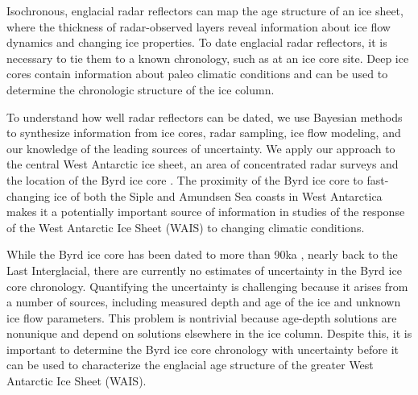 

Isochronous, englacial radar reflectors can map the age structure of an ice sheet, where the thickness of radar-observed layers reveal information about ice flow dynamics and changing ice properties. To date englacial radar reflectors, it is necessary to tie them to a known chronology, such as at an ice core site. Deep ice cores contain information about paleo climatic conditions and can be used to determine the chronologic structure of the ice column. 

To understand how well radar reflectors can be dated, we use Bayesian methods to synthesize information from ice cores, radar sampling, ice flow modeling, and our knowledge of the leading sources of uncertainty. We apply our approach to the central West Antarctic ice sheet, an area of concentrated radar surveys and the location of the Byrd ice core \cite[(80.0167$^\circ$S, 119.5167$^\circ$W),][]{gow1968}. The proximity of the Byrd ice core to fast-changing ice of both the Siple and Amundsen Sea coasts in West Antarctica makes it a potentially important source of information in studies of the response of the West Antarctic Ice Sheet (WAIS) to changing climatic conditions.



While the Byrd ice core has been dated to more than 90ka \citep{}, nearly back to the Last Interglacial, there are currently no estimates of uncertainty in the Byrd ice core chronology. Quantifying the uncertainty is challenging because it arises from a number of sources, including measured depth and age of the ice and unknown ice flow parameters. This problem is nontrivial because age-depth solutions are nonunique and depend on solutions elsewhere in the ice column. Despite this, it is important to determine the Byrd ice core chronology with uncertainty before it can be used to characterize the englacial age structure of the greater West Antarctic Ice Sheet (WAIS). 

